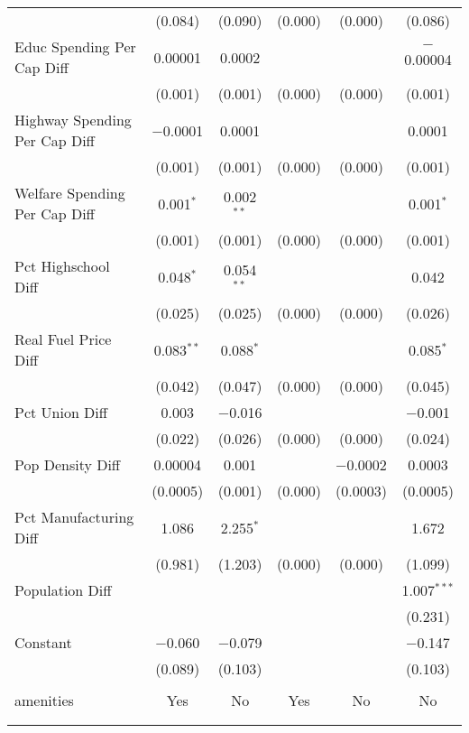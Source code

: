 \begin{table}[!htbp]
\begin{tabular}{@{\extracolsep{5pt}}lccccc}
  & (0.084) & (0.090) & (0.000) & (0.000) & (0.086) \\ 
  Educ Spending Per Cap Diff & 0.00001 & 0.0002 &  &  & $-$0.00004 \\ 
  & (0.001) & (0.001) & (0.000) & (0.000) & (0.001) \\ 
  Highway Spending Per Cap Diff & $-$0.0001 & 0.0001 &  &  & 0.0001 \\ 
  & (0.001) & (0.001) & (0.000) & (0.000) & (0.001) \\ 
  Welfare Spending Per Cap Diff & 0.001$^{*}$ & 0.002$^{**}$ &  &  & 0.001$^{*}$ \\ 
  & (0.001) & (0.001) & (0.000) & (0.000) & (0.001) \\ 
  Pct Highschool Diff & 0.048$^{*}$ & 0.054$^{**}$ &  &  & 0.042 \\ 
  & (0.025) & (0.025) & (0.000) & (0.000) & (0.026) \\ 
  Real Fuel Price Diff & 0.083$^{**}$ & 0.088$^{*}$ &  &  & 0.085$^{*}$ \\ 
  & (0.042) & (0.047) & (0.000) & (0.000) & (0.045) \\ 
  Pct Union Diff & 0.003 & $-$0.016 &  &  & $-$0.001 \\ 
  & (0.022) & (0.026) & (0.000) & (0.000) & (0.024) \\ 
  Pop Density Diff & 0.00004 & 0.001 &  & $-$0.0002 & 0.0003 \\ 
  & (0.0005) & (0.001) & (0.000) & (0.0003) & (0.0005) \\ 
  Pct Manufacturing Diff & 1.086 & 2.255$^{*}$ &  &  & 1.672 \\ 
  & (0.981) & (1.203) & (0.000) & (0.000) & (1.099) \\ 
  Population Diff &  &  &  &  & 1.007$^{***}$ \\ 
  &  &  &  &  & (0.231) \\ 
  Constant & $-$0.060 & $-$0.079 &  &  & $-$0.147 \\ 
  & (0.089) & (0.103) &  &  & (0.103) \\ 
 \hline \\[-1.8ex] 
amenities & Yes & No & Yes & No & No \\ 
\hline \\[-1.8ex] 
\hline 
\hline \\[-1.8ex] 
\end{tabular} 
\end{table} 
